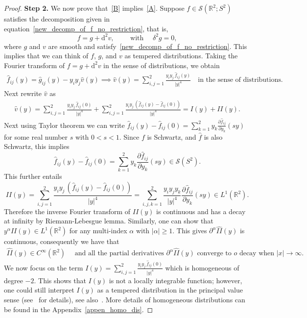 \documentclass[11pt]{article}
\newcommand{\abs}[1]{\lvert #1 \rvert}
\newcommand{\D}{\mathrm{d}}
\newcommand{\wh}{\widehat}
\newcommand{\p}{\partial}
\newcommand*{\Rt}{\mathbb{R}^2}
\newcommand{\sch}{\mathcal{S}}
\newcommand{\qum}[1]{\quad\mbox{#1}}
\begin{document}
\begin{proof}
 \textbf{Step 2.} We now prove that~\ref{B} implies~\ref{A}.  Suppose $f\in \sch(\mathbb{R}^2;S^2)$ satisfies the decomposition given in equation~\eqref{new_decomp_of_f_no_restriction}, that is, 
$$ f = g +\D^2 v, \qquad \mbox{ with } \quad \delta^2 g=0,$$
where $g$ and $v$ are smooth and satisfy~\eqref{new_decomp_of_f_no_restriction}. This  implies that we can think of $f$, $g$, and $v$ as tempered distributions. Taking the Fourier transform of  $ f = g +\D^2 v $ in the sense of distributions, we obtain
\begin{align*}
    \wh{f}_{ij}(y)= \wh{g}_{ij}(y) - y_{i}y_{j} \wh{v}(y) \implies \wh{v}(y) = \sum_{i,j=1}^2 \frac{y_i y_j \, \wh{f}_{ij}(y)}{|y|^4} \quad \mbox{in the sense of distributions}.
\end{align*}
Next rewrite $\wh{v} $ as 
\begin{align*}
 \wh{v}(y) = \sum_{i,j=1}^2 \frac{y_i y_j \, \wh{f}_{ij}(0)}{|y|^4}+ \sum_{i,j=1}^2 \frac{y_i y_j \,( \wh{f}_{ij}(y) - \wh{f}_{ij}(0))}{|y|^4} =I(y) +II(y).   
\end{align*}
Next using Taylor theorem we can write $ \displaystyle \wh{f}_{ij}(y) - \wh{f}_{ij}(0)=  \sum_{k=1}^2 y_k \frac{\partial \widehat{f}_{ij}}{\partial y_k} (sy)$ for some  real number $s$ with $ 0< s< 1 $.   Since $f$ is Schwartz, and  $ \wh{f}$ is also Schwartz, this implies $$  \wh{f}_{ij}(y) - \wh{f}_{ij}(0)= \sum_{k=1}^2 y_k \frac{\partial \widehat{f}_{ij}}{\partial y_k} (sy) \in \sch(S^2).$$  This further  entails 
$$II(y) = \sum_{i,j=1}^2 \frac{y_i y_j \,( \wh{f}_{ij}(y) - \wh{f}_{ij}(0))}{|y|^4} = \sum_{i,j, k=1}^2\frac{y_i y_jy_k}{\abs{y}^4}  \frac{\partial \widehat{f}_{ij}}{\partial y_k} (sy) \in L^1(\Rt).$$ 
Therefore the inverse  Fourier transform of $II(y)$ is continuous and has a decay at infinity by Riemann-Lebesgue lemma. Similarly, one can show that $ y^{\alpha} II(y)\in L^1(\Rt) $ for any multi-index $\alpha$ with $\abs{\alpha}\ge 1.$  This gives $ \p^{\alpha} \wh{II}(y) $ is continuous, consequently we have that 
\begin{align}\label{smoothness_of_II}
    \wh{II}(y)\in C^{\infty}(\Rt) \qum{ and all the partial derivatives $\p^{\alpha} \wh{II}(y)$ converge to $o$   decay when $|x| \rightarrow\infty $. }
\end{align}
We now focus on the term $\displaystyle I(y) =  \sum_{i,j=1}^2 \frac{y_i y_j \, \wh{f}_{ij}(0)}{|y|^4} $ which is homogeneous of  degree $-2$. This shows that $I(y)$ is not a locally integrable function; however, one could still interpret $I(y)$ as a tempered distribution in the principal value sense (see~\cite[Section 8 in  Chapter 3]{Taylor_book} for details), see also~\cite{Hormander_I}. More details of homogeneous distributions can be found in the Appendix~\ref{appen_homo_dis}.

\end{proof}
\end{document}
